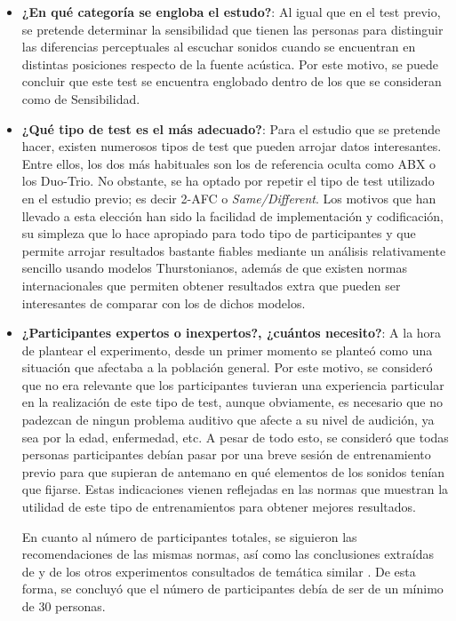 \documentclass[11pt,a4paper]{book}
\begin{document}
                \begin{itemize}
                
                    \item \textbf{¿En qué categoría se engloba el estudo?}: Al igual que en el test previo, se pretende determinar la sensibilidad que tienen las personas para distinguir las diferencias perceptuales al escuchar sonidos cuando se encuentran en distintas posiciones respecto de la fuente acústica. Por este motivo, se puede concluir que este test se encuentra englobado dentro de los que se consideran como de Sensibilidad.
                    \item \textbf{¿Qué tipo de test es el más adecuado?}: Para el estudio que se pretende hacer, existen numerosos tipos de test que pueden arrojar datos interesantes. Entre ellos, los dos más habituales son los de referencia oculta como ABX o los Duo-Trio. No obstante, se ha optado por repetir el tipo de test utilizado en el estudio previo; es decir 2-AFC o \textit{Same/Different}. Los motivos que han llevado a esta elección han sido la facilidad de implementación y codificación, su simpleza que lo hace apropiado para todo tipo de participantes y que permite arrojar resultados bastante fiables mediante un análisis relativamente sencillo usando modelos Thurstonianos, además de que existen normas internacionales que permiten obtener resultados extra que pueden ser interesantes de comparar con los de dichos modelos.
                    \item \textbf{¿Participantes expertos o inexpertos?, ¿cuántos necesito?}: A la hora de plantear el experimento, desde un primer momento se planteó como una situación que afectaba a la población general. Por este motivo, se consideró que no era relevante que los participantes tuvieran una experiencia particular en la realización de este tipo de test, aunque obviamente, es necesario que no padezcan de ningun problema auditivo que afecte a su nivel de audición, ya sea por la edad, enfermedad, etc. A pesar de todo esto, se consideró que todas personas participantes debían pasar por una breve sesión de entrenamiento previo para que supieran de antemano en qué elementos de los sonidos tenían que fijarse. Estas indicaciones vienen reflejadas en las normas \cite{UIT1116, UIT1534, UIT1284, EBU3286, UIT1285, UIT1286} que muestran la utilidad de este tipo de entrenamientos para obtener mejores resultados.
                
                    En cuanto al número de participantes totales, se siguieron las recomendaciones de las mismas normas, así como las conclusiones extraídas de \cite{Tejada2020} y de los otros experimentos consultados de temática similar \cite{2005IWitew, 2019DJSchlit, 2016SKlockgether, 2019LKritly, 2019GPulvirenti, 2019MNowak, 2011VEmiya}. De esta forma, se concluyó que el número de participantes debía de ser de un mínimo de 30 personas.
                    

\end{itemize}
\end{document}
